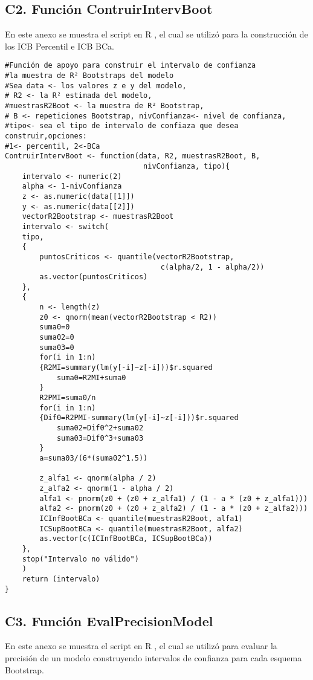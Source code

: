 \newpage

\subsection*{C2. Función ContruirIntervBoot}

En este anexo se muestra el script en R \parencite{R-2024}, el cual se utilizó para la construcción de los ICB Percentil e ICB BCa.

\begin{verbatim}
#Función de apoyo para construir el intervalo de confianza 
#la muestra de R² Bootstraps del modelo
#Sea data <- los valores z e y del modelo,
# R2 <- la R² estimada del modelo, 
#muestrasR2Boot <- la muestra de R² Bootstrap,
# B <- repeticiones Bootstrap, nivConfianza<- nivel de confianza,
#tipo<- sea el tipo de intervalo de confiaza que desea construir,opciones:
#1<- percentil, 2<-BCa
ContruirIntervBoot <- function(data, R2, muestrasR2Boot, B, 
								nivConfianza, tipo){
	intervalo <- numeric(2) 
	alpha <- 1-nivConfianza
	z <- as.numeric(data[[1]])
	y <- as.numeric(data[[2]])
	vectorR2Bootstrap <- muestrasR2Boot
	intervalo <- switch(
	tipo,
	{
		puntosCriticos <- quantile(vectorR2Bootstrap, 
									c(alpha/2, 1 - alpha/2))
		as.vector(puntosCriticos)
	},
	{
		n <- length(z)
		z0 <- qnorm(mean(vectorR2Bootstrap < R2))
		suma0=0
		suma02=0
		suma03=0
		for(i in 1:n)
		{R2MI=summary(lm(y[-i]~z[-i]))$r.squared
			suma0=R2MI+suma0
		}
		R2PMI=suma0/n
		for(i in 1:n)
		{Dif0=R2PMI-summary(lm(y[-i]~z[-i]))$r.squared
			suma02=Dif0^2+suma02
			suma03=Dif0^3+suma03
		}
		a=suma03/(6*(suma02^1.5))
		
		z_alfa1 <- qnorm(alpha / 2)
		z_alfa2 <- qnorm(1 - alpha / 2)
		alfa1 <- pnorm(z0 + (z0 + z_alfa1) / (1 - a * (z0 + z_alfa1)))
		alfa2 <- pnorm(z0 + (z0 + z_alfa2) / (1 - a * (z0 + z_alfa2)))
		ICInfBootBCa <- quantile(muestrasR2Boot, alfa1)
		ICSupBootBCa <- quantile(muestrasR2Boot, alfa2)
		as.vector(c(ICInfBootBCa, ICSupBootBCa))
	},
	stop("Intervalo no válido")
	)
	return (intervalo)
}
\end{verbatim}

\newpage

\subsection*{C3. Función EvalPrecisionModel}

En este anexo se muestra el script en R \parencite{R-2024}, el cual se utilizó para evaluar la precisión de un modelo construyendo intervalos de confianza para cada esquema Bootstrap.\\

